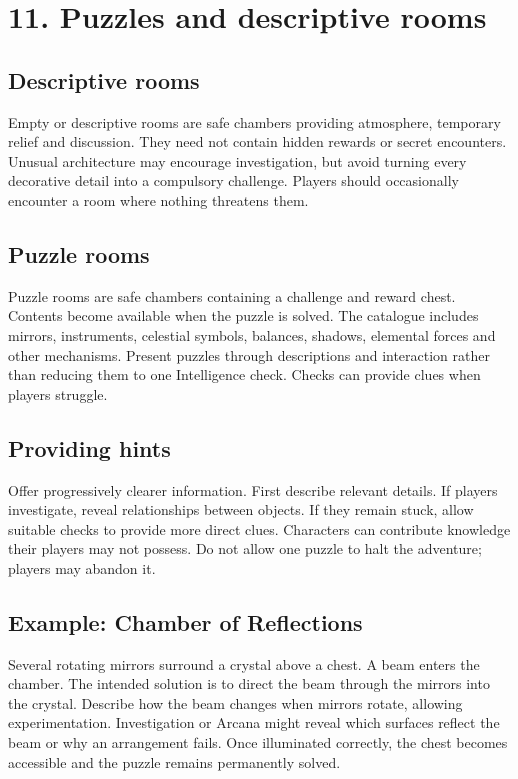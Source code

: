 \section{11. Puzzles and descriptive rooms}

\subsection{Descriptive rooms}

Empty or descriptive rooms are safe chambers providing atmosphere, temporary relief and discussion. They need not contain hidden rewards or secret encounters. Unusual architecture may encourage investigation, but avoid turning every decorative detail into a compulsory challenge. Players should occasionally encounter a room where nothing threatens them.

\subsection{Puzzle rooms}

Puzzle rooms are safe chambers containing a challenge and reward chest. Contents become available when the puzzle is solved. The catalogue includes mirrors, instruments, celestial symbols, balances, shadows, elemental forces and other mechanisms. Present puzzles through descriptions and interaction rather than reducing them to one Intelligence check. Checks can provide clues when players struggle.

\subsection{Providing hints}

Offer progressively clearer information. First describe relevant details. If players investigate, reveal relationships between objects. If they remain stuck, allow suitable checks to provide more direct clues. Characters can contribute knowledge their players may not possess. Do not allow one puzzle to halt the adventure; players may abandon it.

\subsection{Example: Chamber of Reflections}

Several rotating mirrors surround a crystal above a chest. A beam enters the chamber. The intended solution is to direct the beam through the mirrors into the crystal. Describe how the beam changes when mirrors rotate, allowing experimentation. Investigation or Arcana might reveal which surfaces reflect the beam or why an arrangement fails. Once illuminated correctly, the chest becomes accessible and the puzzle remains permanently solved.
